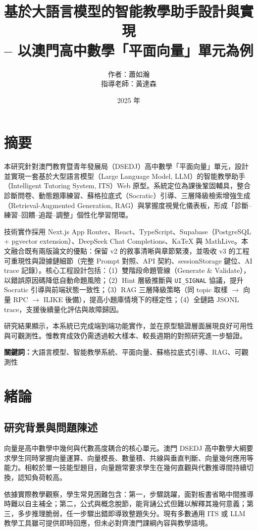 \documentclass[12pt,a4paper]{article}
\title{基於大語言模型的智能教學助手設計與實現\\
\large -- 以澳門高中數學「平面向量」單元為例}
\author{作者：蕭如瀚 \\ 指導老師：黃達森}
\date{2025 年}
\begin{document}
\maketitle
\thispagestyle{empty}
\newpage

\section*{摘要}
本研究針對澳門教育暨青年發展局（DSEDJ）高中數學「平面向量」單元，設計並實現一套基於大型語言模型（Large Language Model, LLM）的智能教學助手（Intelligent Tutoring System, ITS）Web 原型。系統定位為課後鞏固輔具，整合診斷問卷、動態題庫練習、蘇格拉底式（Socratic）引導、三層降級檢索增強生成（Retrieval-Augmented Generation, RAG）與掌握度視覺化儀表板，形成「診斷--練習--回饋--追蹤--調整」個性化學習閉環。

技術實作採用 Next.js App Router、React、TypeScript、Supabase（PostgreSQL + pgvector extension）、DeepSeek Chat Completions、KaTeX 與 MathLive。本文融合既有兩版論文的優點：保留 v2 的敘事清晰與章節緊湊，並吸收 v3 的工程可重現性與證據鏈細節（完整 Prompt 對照、API 契約、sessionStorage 鍵位、AI trace 記錄）。核心工程設計包括：（1）雙階段命題管線（Generate \& Validate），以錯誤原因碼降低自動命題風險；（2）Hint 層級推斷與 \texttt{UI\_SIGNAL} 協議，提升 Socratic 引導與前端狀態一致性；（3）RAG 三層降級策略（同 topic 取樣 $\rightarrow$ 向量 RPC $\rightarrow$ ILIKE 後備），提高小題庫情境下的穩定性；（4）全鏈路 JSONL trace，支援後續量化評估與故障歸因。

研究結果顯示，本系統已完成端到端功能實作，並在原型驗證層面展現良好可用性與可觀測性。惟教育成效仍需透過較大樣本、較長週期的對照研究進一步驗證。

\noindent\textbf{關鍵詞：}大語言模型、智能教學系統、平面向量、蘇格拉底式引導、RAG、可觀測性

\newpage
\tableofcontents
\newpage

\section{緒論}
\subsection{研究背景與問題陳述}
向量是高中數學中幾何與代數高度耦合的核心單元。澳門 DSEDJ 高中數學大綱要求學生同時掌握向量運算、向量模長、數量積、共線與垂直判斷、向量幾何應用等能力。相較於單一技能型題目，向量題常要求學生在幾何直觀與代數推導間持續切換，認知負荷較高。

依據實際教學觀察，學生常見困難包含：第一，步驟跳躍，面對板書省略中間推導時難以自主補全；第二，公式與概念脫節，能背誦公式但難以解釋其幾何意義；第三，多步推理脆弱，任一步驟出錯即導致整題失分。現有多數通用 ITS 或 LLM 教學工具雖可提供即時回應，但未必對齊澳門課綱內容與教學語境。
\end{document}
